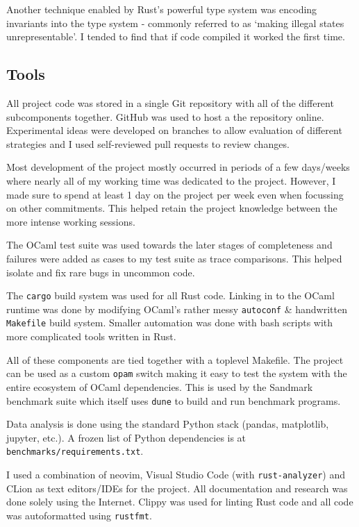 Another technique enabled by Rust's powerful type system was encoding invariants into the type
system - commonly referred to as `making illegal states unrepresentable'. I tended to find that if
code compiled it worked the first time.

\subsection{Tools}

All project code was stored in a single Git repository with all of the different subcomponents
together. GitHub was used to host a the repository online. Experimental ideas were developed on
branches to allow evaluation of different
strategies and I used self-reviewed pull requests to review changes.

Most development of the project mostly occurred in periods of a few days/weeks where nearly
all of my working time was dedicated to the project. However, I made sure to spend at least 1 day
on the project per week even when focussing on other commitments. This helped retain the project
knowledge between the more intense working sessions.

The OCaml test suite was used towards the later stages of completeness and failures were added as
cases to my test suite as trace comparisons. This helped isolate and fix rare bugs in uncommon
code.

The \texttt{cargo} build system was used for all Rust code. Linking in to the OCaml runtime
was done by modifying OCaml's rather messy \texttt{autoconf} \& handwritten \texttt{Makefile} build
system. Smaller automation was done with bash scripts with more complicated tools written in Rust.

All of these components are tied together with a toplevel Makefile. The project can be used as a
custom
\texttt{opam} switch making it easy to test the system with the entire ecosystem of OCaml
dependencies.
This is used by the Sandmark benchmark suite which itself uses \texttt{dune} to build and run
benchmark programs.

Data analysis is done using the standard Python stack (pandas, matplotlib, jupyter, etc.). A frozen
list of Python dependencies is at \texttt{benchmarks/requirements.txt}.

I used a combination of neovim, Visual Studio Code (with \texttt{rust-analyzer}) and CLion as text
editors/IDEs for the project. All documentation and research was done solely using the Internet.
Clippy was used for linting Rust code and all code was autoformatted using \texttt{rustfmt}.

